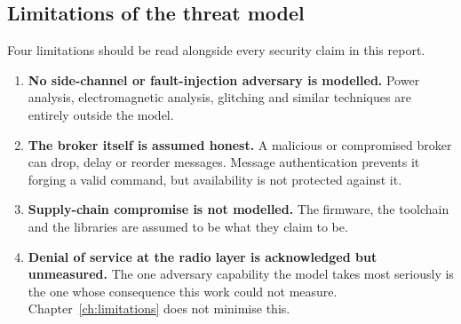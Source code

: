 \subsection{Limitations of the threat model}

Four limitations should be read alongside every security claim in this report.

\begin{enumerate}[leftmargin=1.8em,itemsep=4pt]
  \item \textbf{No side-channel or fault-injection adversary is modelled.} Power analysis,
        electromagnetic analysis, glitching and similar techniques are entirely outside the
        model.
  \item \textbf{The broker itself is assumed honest.} A malicious or compromised broker can
        drop, delay or reorder messages. Message authentication prevents it forging a valid
        command, but availability is not protected against it.
  \item \textbf{Supply-chain compromise is not modelled.} The firmware, the toolchain and the
        libraries are assumed to be what they claim to be.
  \item \textbf{Denial of service at the radio layer is acknowledged but unmeasured.} The one
        adversary capability the model takes most seriously is the one whose consequence this
        work could not measure. Chapter~\ref{ch:limitations} does not minimise this.
\end{enumerate}

